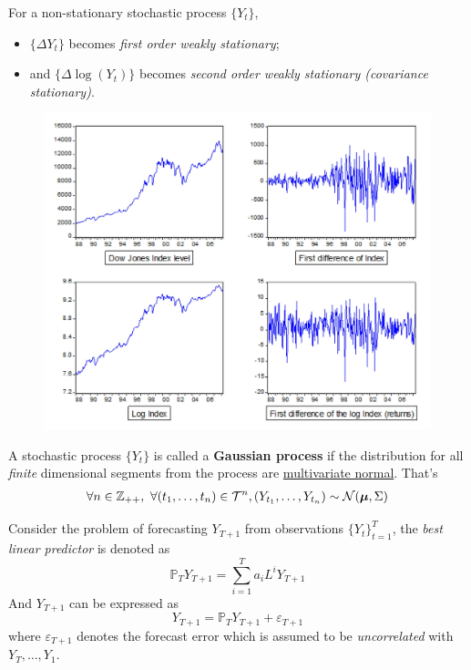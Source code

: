 \documentclass[11pt]{article}
\begin{document}
		\begin{proposition}
			For a non-stationary stochastic process $\{Y_t\}$,
			\begin{itemize}
				\item $\{\Delta Y_t\}$ becomes \emph{first order weakly stationary};
				\item and $\{\Delta \log(Y_t)\}$ becomes \emph{second order weakly stationary (covariance stationary)}.
			\end{itemize}
			\begin{figure}[h]
				\centering
				\includegraphics{figures/2_1}
			\end{figure}
		\end{proposition}
		
		\begin{definition}[1.8]
			A stochastic process $\{Y_t\}$ is called a \textbf{Gaussian process} if the distribution for all \emph{finite} dimensional segments from the process are \ul{multivariate normal}. That's
			\begin{gather}
				\forall n \in \mathbb{Z}_{++},\ \forall (t_1, \dots, t_n) \in \mathcal{{T}}^n, (Y_{t_1}, \dots, Y_{t_n}) \sim \mathcal{{N}}(\boldsymbol{\mu}, \Sigma)
			\end{gather}
		\end{definition}
		
		\begin{notation}
			Consider the problem of forecasting $Y_{T+1}$ from observations $\{Y_t\}_{t=1}^{T}$, the \emph{best linear predictor} is denoted as
			\begin{equation}
				\mathbb{P}_T Y_{T+1} = \sum_{i=1}^{T} a_i L^i Y_{T+1}
			\end{equation}
			And $Y_{T+1}$ can be expressed as
			\begin{equation}
				Y_{T+1} = \mathbb{P}_T Y_{T+1} + \varepsilon_{T+1}
			\end{equation}
			where $\varepsilon_{T+1}$ denotes the forecast error which is assumed to be \emph{uncorrelated} with $Y_T, \dots, Y_1$.
		\end{notation}
		
\end{document}
